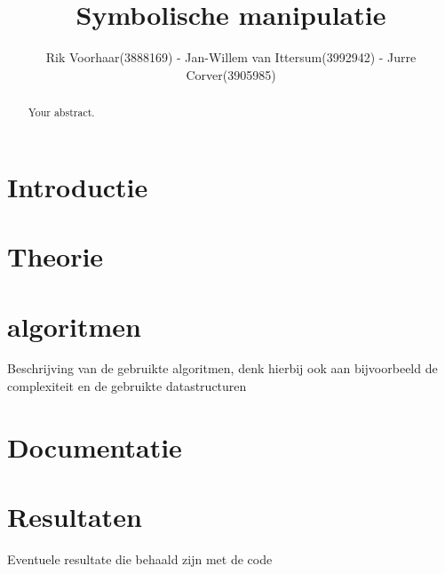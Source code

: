 \documentclass[a4paper]{article}
\title{Symbolische manipulatie}
\author{Rik Voorhaar(3888169) - Jan-Willem van Ittersum(3992942) - Jurre Corver(3905985)}
\begin{document}
\maketitle

\begin{abstract}
Your abstract.
\end{abstract}

\section{Introductie}




\section{Theorie}


\section{algoritmen}
Beschrijving van de gebruikte algoritmen, denk hierbij ook aan bijvoorbeeld de complexiteit en de gebruikte datastructuren



\section{Documentatie}


\section{Resultaten}
Eventuele resultate die behaald zijn met de code





\end{document}
